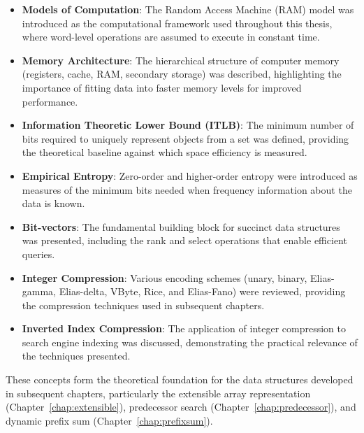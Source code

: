 \begin{itemize}
    \item \textbf{Models of Computation}: The Random Access Machine (RAM) model was introduced as the computational framework used throughout this thesis, where word-level operations are assumed to execute in constant time.

    \item \textbf{Memory Architecture}: The hierarchical structure of computer memory (registers, cache, RAM, secondary storage) was described, highlighting the importance of fitting data into faster memory levels for improved performance.

    \item \textbf{Information Theoretic Lower Bound (ITLB)}: The minimum number of bits required to uniquely represent objects from a set was defined, providing the theoretical baseline against which space efficiency is measured.

    \item \textbf{Empirical Entropy}: Zero-order and higher-order entropy were introduced as measures of the minimum bits needed when frequency information about the data is known.

    \item \textbf{Bit-vectors}: The fundamental building block for succinct data structures was presented, including the rank and select operations that enable efficient queries.

    \item \textbf{Integer Compression}: Various encoding schemes (unary, binary, Elias-gamma, Elias-delta, VByte, Rice, and Elias-Fano) were reviewed, providing the compression techniques used in subsequent chapters.

    \item \textbf{Inverted Index Compression}: The application of integer compression to search engine indexing was discussed, demonstrating the practical relevance of the techniques presented.
\end{itemize}

These concepts form the theoretical foundation for the data structures developed in subsequent chapters, particularly the extensible array representation (Chapter~\ref{chap:extensible}), predecessor search (Chapter~\ref{chap:predecessor}), and dynamic prefix sum (Chapter~\ref{chap:prefixsum}).
